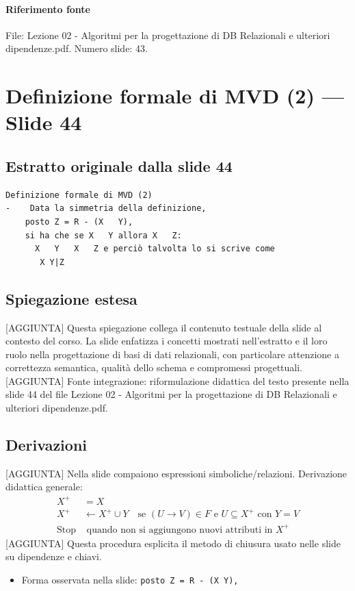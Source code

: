 \documentclass[11pt]{article}
\begin{document}
\paragraph{Riferimento fonte} File: Lezione 02 - Algoritmi per la progettazione di DB Relazionali e ulteriori dipendenze.pdf. Numero slide: 43.
\section{Definizione formale di MVD (2) --- Slide 44}
\subsection*{Estratto originale dalla slide 44}
\begin{lstlisting}
Definizione formale di MVD (2)
-    Data la simmetria della definizione,
    posto Z = R - (X   Y),
    si ha che se X   Y allora X   Z:
      X   Y   X   Z e perciò talvolta lo si scrive come
       X Y|Z
\end{lstlisting}
\subsection*{Spiegazione estesa}
[AGGIUNTA] Questa spiegazione collega il contenuto testuale della slide al contesto del corso. La slide enfatizza i concetti mostrati nell'estratto e il loro ruolo nella progettazione di basi di dati relazionali, con particolare attenzione a correttezza semantica, qualità dello schema e compromessi progettuali.
[AGGIUNTA] Fonte integrazione: riformulazione didattica del testo presente nella slide 44 del file Lezione 02 - Algoritmi per la progettazione di DB Relazionali e ulteriori dipendenze.pdf.
\subsection*{Derivazioni}
[AGGIUNTA] Nella slide compaiono espressioni simboliche/relazioni. Derivazione didattica generale:
\begin{align*}
X^+ &= X \\
X^+ &\leftarrow X^+ \cup Y \quad \text{se } (U \to V) \in F \text{ e } U \subseteq X^+ \text{ con } Y=V \\
\text{Stop} &\text{ quando non si aggiungono nuovi attributi in } X^+
\end{align*}
[AGGIUNTA] Questa procedura esplicita il metodo di chiusura usato nelle slide su dipendenze e chiavi.
\begin{itemize}[leftmargin=*]
\item Forma osservata nella slide: \texttt{posto Z = R - (X   Y),}
\end{itemize}
\end{document}
